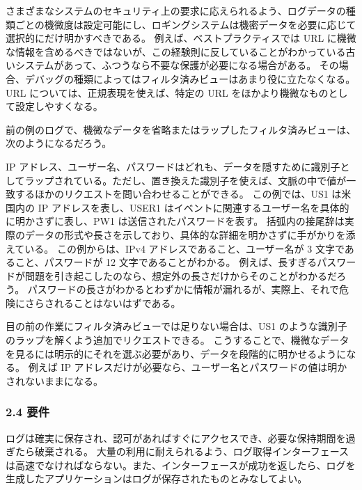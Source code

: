 \documentclass[uplatex]{jsarticle}
\def\ref#1{ref}%
\begin{document}
さまざまなシステムのセキュリティ上の要求に応えられるよう、ログデータの種類ごとの機微度は設定可能にし、ロギングシステムは機密データを必要に応じて選択的にだけ明かすべきである。
例えば、ベストプラクティスでは URL に機微な情報を含めるべきではないが、この経験則に反していることがわかっている古いシステムがあって、ふつうなら不要な保護が必要になる場合がある。
その場合、デバッグの種類によってはフィルタ済みビューはあまり役に立たなくなる。
URL については、正規表現を使えば、特定の URL をほかより機微なものとして設定しやすくなる。

前の例のログで、機微なデータを省略またはラップしたフィルタ済みビューは、次のようになるだろう。

IP アドレス、ユーザー名、パスワードはどれも、データを隠すために識別子としてラップされている。ただし、置き換えた識別子を使えば、文脈の中で値が一致するほかのリクエストを問い合わせることができる。
この例では、US1 は米国内の IP アドレスを表し、USER1 はイベントに関連するユーザー名を具体的に明かさずに表し、PW1 は送信されたパスワードを表す。
括弧内の接尾辞は実際のデータの形式や長さを示しており、具体的な詳細を明かさずに手がかりを添えている。
この例からは、IPv4 アドレスであること、ユーザー名が 3 文字であること、パスワードが 12 文字であることがわかる。
例えば、長すぎるパスワードが問題を引き起こしたのなら、想定外の長さだけからそのことがわかるだろう。
パスワードの長さがわかるとわずかに情報が漏れるが、実際上、それで危険にさらされることはないはずである。

目の前の作業にフィルタ済みビューでは足りない場合は、US1 のような識別子のラップを解くよう追加でリクエストできる。
こうすることで、機微なデータを見るには明示的にそれを選ぶ必要があり、データを段階的に明かせるようになる。
例えば IP アドレスだけが必要なら、ユーザー名とパスワードの値は明かされないままになる。

\subsubsection{2.4 要件}

ログは確実に保存され、認可があればすぐにアクセスでき、必要な保持期間を過ぎたら破棄される。
大量の利用に耐えられるよう、ログ取得インターフェースは高速でなければならない。また、インターフェースが成功を返したら、ログを生成したアプリケーションはログが保存されたものとみなしてよい。
\end{document}
